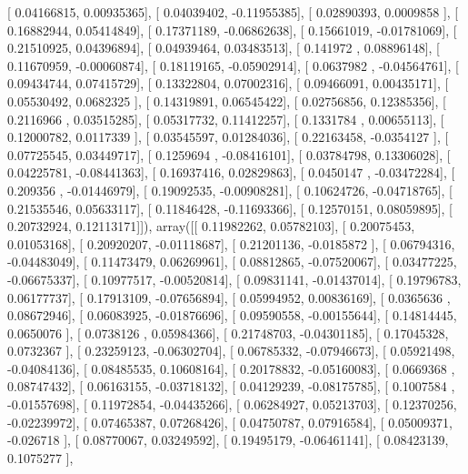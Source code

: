 \documentclass{article}
\begin{document}
       [ 0.04166815,  0.00935365],
       [ 0.04039402, -0.11955385],
       [ 0.02890393,  0.0009858 ],
       [ 0.16882944,  0.05414849],
       [ 0.17371189, -0.06862638],
       [ 0.15661019, -0.01781069],
       [ 0.21510925,  0.04396894],
       [ 0.04939464,  0.03483513],
       [ 0.141972  ,  0.08896148],
       [ 0.11670959, -0.00060874],
       [ 0.18119165, -0.05902914],
       [ 0.0637982 , -0.04564761],
       [ 0.09434744,  0.07415729],
       [ 0.13322804,  0.07002316],
       [ 0.09466091,  0.00435171],
       [ 0.05530492,  0.0682325 ],
       [ 0.14319891,  0.06545422],
       [ 0.02756856,  0.12385356],
       [ 0.2116966 ,  0.03515285],
       [ 0.05317732,  0.11412257],
       [ 0.1331784 ,  0.00655113],
       [ 0.12000782,  0.0117339 ],
       [ 0.03545597,  0.01284036],
       [ 0.22163458, -0.0354127 ],
       [ 0.07725545,  0.03449717],
       [ 0.1259694 , -0.08416101],
       [ 0.03784798,  0.13306028],
       [ 0.04225781, -0.08441363],
       [ 0.16937416,  0.02829863],
       [ 0.0450147 , -0.03472284],
       [ 0.209356  , -0.01446979],
       [ 0.19092535, -0.00908281],
       [ 0.10624726, -0.04718765],
       [ 0.21535546,  0.05633117],
       [ 0.11846428, -0.11693366],
       [ 0.12570151,  0.08059895],
       [ 0.20732924,  0.12113171]]), array([[ 0.11982262,  0.05782103],
       [ 0.20075453,  0.01053168],
       [ 0.20920207, -0.01118687],
       [ 0.21201136, -0.0185872 ],
       [ 0.06794316, -0.04483049],
       [ 0.11473479,  0.06269961],
       [ 0.08812865, -0.07520067],
       [ 0.03477225, -0.06675337],
       [ 0.10977517, -0.00520814],
       [ 0.09831141, -0.01437014],
       [ 0.19796783,  0.06177737],
       [ 0.17913109, -0.07656894],
       [ 0.05994952,  0.00836169],
       [ 0.0365636 ,  0.08672946],
       [ 0.06083925, -0.01876696],
       [ 0.09590558, -0.00155644],
       [ 0.14814445,  0.0650076 ],
       [ 0.0738126 ,  0.05984366],
       [ 0.21748703, -0.04301185],
       [ 0.17045328,  0.0732367 ],
       [ 0.23259123, -0.06302704],
       [ 0.06785332, -0.07946673],
       [ 0.05921498, -0.04084136],
       [ 0.08485535,  0.10608164],
       [ 0.20178832, -0.05160083],
       [ 0.0669368 ,  0.08747432],
       [ 0.06163155, -0.03718132],
       [ 0.04129239, -0.08175785],
       [ 0.1007584 , -0.01557698],
       [ 0.11972854, -0.04435266],
       [ 0.06284927,  0.05213703],
       [ 0.12370256, -0.02239972],
       [ 0.07465387,  0.07268426],
       [ 0.04750787,  0.07916584],
       [ 0.05009371, -0.026718  ],
       [ 0.08770067,  0.03249592],
       [ 0.19495179, -0.06461141],
       [ 0.08423139,  0.1075277 ],
\end{document}
